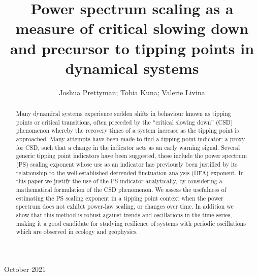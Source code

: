 \documentclass[10pt]{iopart}
\newcommand{\revision}[1]{\color{red} {#1}}
\begin{document}
\title[Power spectrum scaling as a measure of critical slowing down]{Power spectrum scaling as a measure of critical slowing down and precursor to tipping points in dynamical systems}

\author{Joshua Prettyman; Tobia Kuna; Valerie Livina}

\address{}
\vspace{10pt}
\begin{indented}
	\item[] October 2021
\end{indented}

\begin{abstract}
Many dynamical systems experience sudden shifts in behaviour known as tipping points or critical transitions, often preceded by the ``critical slowing down'' (CSD) phenomenon whereby the recovery times of a system increase as the tipping point is approached. Many attempts have been made to find a tipping point indicator: a proxy for CSD, such that a change in the indicator acts as an early warning signal. Several generic tipping point indicators have been suggested, these include the power spectrum (PS) scaling exponent whose use as an indicator has previously been justified by its relationship to the well-established detrended fluctuation analysis (DFA) exponent. {\revision In this paper we justify the use of the PS indicator analytically, by considering a mathematical formulation of the CSD phenomenon}. We assess the usefulness of estimating the PS scaling exponent in a tipping point context when the power spectrum does not exhibit power-law scaling, or changes over time. In addition we show that this method is robust against trends and oscillations in the time series, making it a good candidate for studying resilience of systems with periodic oscillations which are observed in ecology and geophysics. 
\end{abstract}


\submitto{\ERL}
\ioptwocol
\end{document}
